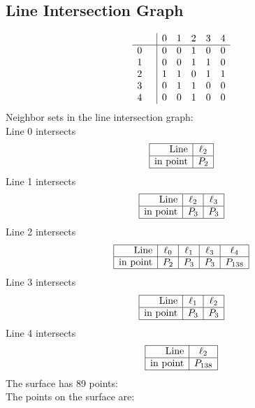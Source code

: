 \documentclass{article}
\begin{document}
{\subsection*{Line Intersection Graph}
{\arraycolsep=1pt
$$
\begin{array}{rr|*{5}r}
 &  & 0 & 1 & 2 & 3 & 4\\
\hline
0 &  & 0 & 0 & 1 & 0 & 0\\
1 &  & 0 & 0 & 1 & 1 & 0\\
2 &  & 1 & 1 & 0 & 1 & 1\\
3 &  & 0 & 1 & 1 & 0 & 0\\
4 &  & 0 & 0 & 1 & 0 & 0\\
\end{array}
$$
}%
Neighbor sets in the line intersection graph:\\
Line 0 intersects 
$$
\begin{array}{|r*{1}{|c}|}
\hline
\mbox{Line}  & \ell_{2}\\
\hline
\mbox{in point}  & P_{2}\\
\hline
\end{array}
$$
Line 1 intersects 
$$
\begin{array}{|r*{2}{|c}|}
\hline
\mbox{Line}  & \ell_{2} & \ell_{3}\\
\hline
\mbox{in point}  & P_{3} & P_{3}\\
\hline
\end{array}
$$
Line 2 intersects 
$$
\begin{array}{|r*{4}{|c}|}
\hline
\mbox{Line}  & \ell_{0} & \ell_{1} & \ell_{3} & \ell_{4}\\
\hline
\mbox{in point}  & P_{2} & P_{3} & P_{3} & P_{138}\\
\hline
\end{array}
$$
Line 3 intersects 
$$
\begin{array}{|r*{2}{|c}|}
\hline
\mbox{Line}  & \ell_{1} & \ell_{2}\\
\hline
\mbox{in point}  & P_{3} & P_{3}\\
\hline
\end{array}
$$
Line 4 intersects 
$$
\begin{array}{|r*{1}{|c}|}
\hline
\mbox{Line}  & \ell_{2}\\
\hline
\mbox{in point}  & P_{138}\\
\hline
\end{array}
$$
The surface has 89 points:\\
The points on the surface are:\\
\begin{multicols}{3}

\end{multicols}}
\end{document}
